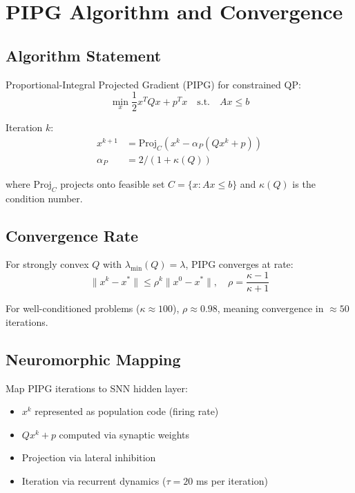 \chapter{PIPG Algorithm and Convergence}
\label{app:pipg}

\section{Algorithm Statement}

Proportional-Integral Projected Gradient (PIPG) for constrained QP:
\[
\min_x \frac{1}{2} x^T Q x + p^T x \quad \text{s.t.} \quad Ax \leq b
\]

Iteration $k$:
\begin{align}
x^{k+1} &= \text{Proj}_C(x^k - \alpha_P (Q x^k + p)) \\
\alpha_P &= 2 / (1 + \kappa(Q))
\end{align}

where $\text{Proj}_C$ projects onto feasible set $C = \{x : Ax \leq b\}$ and $\kappa(Q)$ is the condition number.

\section{Convergence Rate}

For strongly convex $Q$ with $\lambda_{\min}(Q) = \lambda$, PIPG converges at rate:
\[
\|x^k - x^*\| \leq \rho^k \|x^0 - x^*\|, \quad \rho = \frac{\kappa - 1}{\kappa + 1}
\]

For well-conditioned problems ($\kappa \approx 100$), $\rho \approx 0.98$, meaning convergence in $\approx 50$ iterations.

\section{Neuromorphic Mapping}

Map PIPG iterations to SNN hidden layer:
\begin{itemize}
\item $x^k$ represented as population code (firing rate)
\item $Qx^k + p$ computed via synaptic weights
\item Projection via lateral inhibition
\item Iteration via recurrent dynamics ($\tau = 20$ ms per iteration)
\end{itemize}


